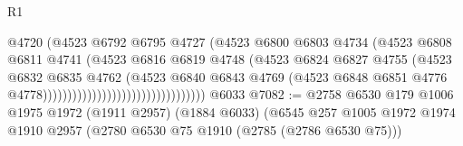 \begin{lexlean}{R1}
\begin{coremodule}
                                                      @4720
                                                      (@4523
                                                        @6792
                                                        @6795
                                                        @4727
                                                        (@4523
                                                          @6800
                                                          @6803
                                                          @4734
                                                          (@4523
                                                            @6808
                                                            @6811
                                                            @4741
                                                            (@4523
                                                              @6816
                                                              @6819
                                                              @4748
                                                              (@4523
                                                                @6824
                                                                @6827
                                                                @4755
                                                                (@4523
                                                                  @6832
                                                                  @6835
                                                                  @4762
                                                                  (@4523
                                                                    @6840
                                                                    @6843
                                                                    @4769
                                                                    (@4523
                                                                      @6848
                                                                      @6851
                                                                      @4776
                                                                      @4778)))))))))))))))))))))))))))))))))
    @6033
@7082 := @2758
    @6530
    @179
    @1006
    @1975
    @1972
    (@1911 @2957)
    (@1884 @6033)
    (@6545
      @257
      @1005
      @1972
      @1974
      @1910
      @2957
      (@2780 @6530 @75 @1910 (@2785 (@2786 @6530 @75)))

\end{coremodule}
\end{lexlean}
